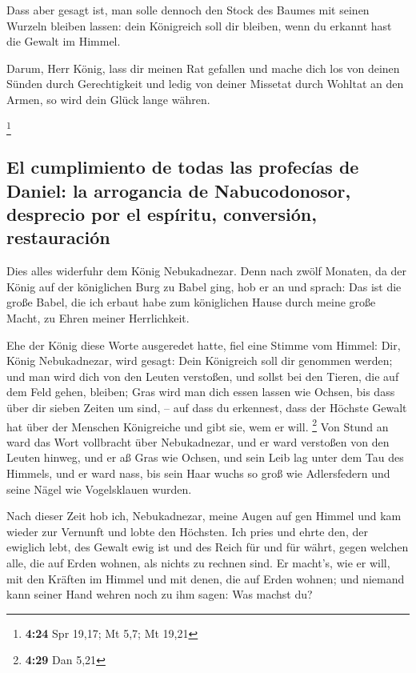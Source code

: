  Dass aber gesagt ist, man solle dennoch den Stock des
Baumes mit seinen Wurzeln bleiben lassen: dein Königreich soll dir
bleiben, wenn du erkannt hast die Gewalt im Himmel.

 Darum, Herr König, lass dir meinen Rat gefallen und
mache dich los von deinen Sünden durch Gerechtigkeit und ledig von
deiner Missetat durch Wohltat an den Armen, so wird dein Glück lange
währen.

\footnote{\textbf{4:24} Spr 19,17; Mt 5,7; Mt 19,21}

\hypertarget{el-cumplimiento-de-todas-las-profecuxedas-de-daniel-la-arrogancia-de-nabucodonosor-desprecio-por-el-espuxedritu-conversiuxf3n-restauraciuxf3n}{%
\subsection{El cumplimiento de todas las profecías de Daniel: la
arrogancia de Nabucodonosor, desprecio por el espíritu, conversión,
restauración}\label{el-cumplimiento-de-todas-las-profecuxedas-de-daniel-la-arrogancia-de-nabucodonosor-desprecio-por-el-espuxedritu-conversiuxf3n-restauraciuxf3n}}

 Dies alles widerfuhr dem König Nebukadnezar.
 Denn nach zwölf Monaten, da der König auf der
königlichen Burg zu Babel ging,  hob er an und sprach:
Das ist die große Babel, die ich erbaut habe zum königlichen Hause durch
meine große Macht, zu Ehren meiner Herrlichkeit.

 Ehe der König diese Worte ausgeredet hatte, fiel eine
Stimme vom Himmel: Dir, König Nebukadnezar, wird gesagt: Dein Königreich
soll dir genommen werden;  und man wird dich von den
Leuten verstoßen, und sollst bei den Tieren, die auf dem Feld gehen,
bleiben; Gras wird man dich essen lassen wie Ochsen, bis dass über dir
sieben Zeiten um sind, -- auf dass du erkennest, dass der Höchste Gewalt
hat über der Menschen Königreiche und gibt sie, wem er will. \footnote{\textbf{4:29}
  Dan 5,21}  Von Stund an ward das Wort vollbracht über
Nebukadnezar, und er ward verstoßen von den Leuten hinweg, und er aß
Gras wie Ochsen, und sein Leib lag unter dem Tau des Himmels, und er
ward nass, bis sein Haar wuchs so groß wie Adlersfedern und seine Nägel
wie Vogelsklauen wurden.

 Nach dieser Zeit hob ich, Nebukadnezar, meine Augen auf
gen Himmel und kam wieder zur Vernunft und lobte den Höchsten. Ich pries
und ehrte den, der ewiglich lebt, des Gewalt ewig ist und des Reich für
und für währt,  gegen welchen alle, die auf Erden wohnen,
als nichts zu rechnen sind. Er macht's, wie er will, mit den Kräften im
Himmel und mit denen, die auf Erden wohnen; und niemand kann seiner Hand
wehren noch zu ihm sagen: Was machst du?

